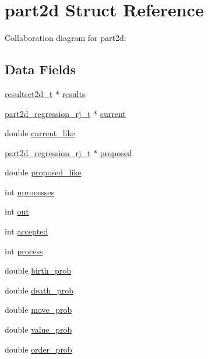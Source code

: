 \hypertarget{structpart2d}{}\section{part2d Struct Reference}
\label{structpart2d}


Collaboration diagram for part2d\+:
\subsection*{Data Fields}
\begin{DoxyCompactItemize}
\item 
\hyperlink{resultset2d_8h_a7d7cd3bde6bca10a8480a58c69d3787e}{resultset2d\+\_\+t} $\ast$ \hyperlink{structpart2d_a5ac128b4b2fd467b649402dbc4eaaffc}{results}
\item 
\hyperlink{part2d__regression__rj_8h_ad1fad89a34833691d87c82b765880cbc}{part2d\+\_\+regression\+\_\+rj\+\_\+t} $\ast$ \hyperlink{structpart2d_a54d459969d63631513d399f101dba2f3}{current}
\item 
double \hyperlink{structpart2d_ad0a254abb0f7fd5f55f7955b71e32111}{current\+\_\+like}
\item 
\hyperlink{part2d__regression__rj_8h_ad1fad89a34833691d87c82b765880cbc}{part2d\+\_\+regression\+\_\+rj\+\_\+t} $\ast$ \hyperlink{structpart2d_a5e5a15189e5e3b4320372369e920bab9}{proposed}
\item 
double \hyperlink{structpart2d_ad98128b1a503b685fd864a562ea838b0}{proposed\+\_\+like}
\item 
int \hyperlink{structpart2d_a8399e897ccade994c9e97d62b74df155}{nprocesses}
\item 
int \hyperlink{structpart2d_a2f4c516b332c9597b755780a3830031b}{out}
\item 
int \hyperlink{structpart2d_a06814a7ff2b812578c137f2a91b514ed}{accepted}
\item 
int \hyperlink{structpart2d_ad8f3d80056c2a99079cdb9a39bd4d9cd}{process}
\item 
double \hyperlink{structpart2d_af8cda1814348b3dc3c0b4b9b66e42617}{birth\+\_\+prob}
\item 
double \hyperlink{structpart2d_a98ff4f5abc34ced0dd16fe2627347488}{death\+\_\+prob}
\item 
double \hyperlink{structpart2d_a668d06034c4dc3690deb2a919c7203b2}{move\+\_\+prob}
\item 
double \hyperlink{structpart2d_a857e8dc79c4805d6e36dd1081ee6ca7e}{value\+\_\+prob}
\item 
double \hyperlink{structpart2d_a3b1572226954d2a39593ee813414be4e}{order\+\_\+prob}

\end{DoxyCompactItemize}
